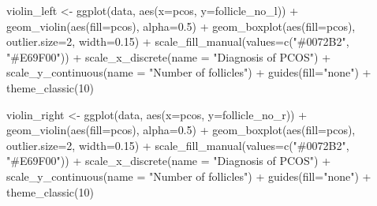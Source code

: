 \documentclass[
]{article}
\newenvironment{Shaded}{\begin{snugshade}}{\end{snugshade}}
\newcommand{\AttributeTok}[1]{\textcolor[rgb]{0.77,0.63,0.00}{#1}}
\newcommand{\DecValTok}[1]{\textcolor[rgb]{0.00,0.00,0.81}{#1}}
\newcommand{\FloatTok}[1]{\textcolor[rgb]{0.00,0.00,0.81}{#1}}
\newcommand{\FunctionTok}[1]{\textcolor[rgb]{0.00,0.00,0.00}{#1}}
\newcommand{\NormalTok}[1]{#1}
\newcommand{\OtherTok}[1]{\textcolor[rgb]{0.56,0.35,0.01}{#1}}
\newcommand{\SpecialCharTok}[1]{\textcolor[rgb]{0.00,0.00,0.00}{#1}}
\newcommand{\StringTok}[1]{\textcolor[rgb]{0.31,0.60,0.02}{#1}}
\begin{document}
\begin{Shaded}
\begin{Highlighting}[]
\NormalTok{violin\_left }\OtherTok{\textless{}{-}} \FunctionTok{ggplot}\NormalTok{(data, }\FunctionTok{aes}\NormalTok{(}\AttributeTok{x=}\NormalTok{pcos, }\AttributeTok{y=}\NormalTok{follicle\_no\_l)) }\SpecialCharTok{+}
  \FunctionTok{geom\_violin}\NormalTok{(}\FunctionTok{aes}\NormalTok{(}\AttributeTok{fill=}\NormalTok{pcos), }\AttributeTok{alpha=}\FloatTok{0.5}\NormalTok{) }\SpecialCharTok{+}
  \FunctionTok{geom\_boxplot}\NormalTok{(}\FunctionTok{aes}\NormalTok{(}\AttributeTok{fill=}\NormalTok{pcos), }\AttributeTok{outlier.size=}\DecValTok{2}\NormalTok{, }\AttributeTok{width=}\FloatTok{0.15}\NormalTok{) }\SpecialCharTok{+}
  \FunctionTok{scale\_fill\_manual}\NormalTok{(}\AttributeTok{values=}\FunctionTok{c}\NormalTok{(}\StringTok{"\#0072B2"}\NormalTok{, }\StringTok{"\#E69F00"}\NormalTok{)) }\SpecialCharTok{+}
  \FunctionTok{scale\_x\_discrete}\NormalTok{(}\AttributeTok{name =} \StringTok{"Diagnosis of PCOS"}\NormalTok{) }\SpecialCharTok{+}
  \FunctionTok{scale\_y\_continuous}\NormalTok{(}\AttributeTok{name =} \StringTok{"Number of follicles"}\NormalTok{) }\SpecialCharTok{+}
  \FunctionTok{guides}\NormalTok{(}\AttributeTok{fill=}\StringTok{"none"}\NormalTok{) }\SpecialCharTok{+}
  \FunctionTok{theme\_classic}\NormalTok{(}\DecValTok{10}\NormalTok{)}

\NormalTok{violin\_right }\OtherTok{\textless{}{-}} \FunctionTok{ggplot}\NormalTok{(data, }\FunctionTok{aes}\NormalTok{(}\AttributeTok{x=}\NormalTok{pcos, }\AttributeTok{y=}\NormalTok{follicle\_no\_r)) }\SpecialCharTok{+}
  \FunctionTok{geom\_violin}\NormalTok{(}\FunctionTok{aes}\NormalTok{(}\AttributeTok{fill=}\NormalTok{pcos), }\AttributeTok{alpha=}\FloatTok{0.5}\NormalTok{) }\SpecialCharTok{+}
  \FunctionTok{geom\_boxplot}\NormalTok{(}\FunctionTok{aes}\NormalTok{(}\AttributeTok{fill=}\NormalTok{pcos), }\AttributeTok{outlier.size=}\DecValTok{2}\NormalTok{, }\AttributeTok{width=}\FloatTok{0.15}\NormalTok{) }\SpecialCharTok{+}
  \FunctionTok{scale\_fill\_manual}\NormalTok{(}\AttributeTok{values=}\FunctionTok{c}\NormalTok{(}\StringTok{"\#0072B2"}\NormalTok{, }\StringTok{"\#E69F00"}\NormalTok{)) }\SpecialCharTok{+}
  \FunctionTok{scale\_x\_discrete}\NormalTok{(}\AttributeTok{name =} \StringTok{"Diagnosis of PCOS"}\NormalTok{) }\SpecialCharTok{+}
  \FunctionTok{scale\_y\_continuous}\NormalTok{(}\AttributeTok{name =} \StringTok{"Number of follicles"}\NormalTok{) }\SpecialCharTok{+}
  \FunctionTok{guides}\NormalTok{(}\AttributeTok{fill=}\StringTok{"none"}\NormalTok{) }\SpecialCharTok{+}
  \FunctionTok{theme\_classic}\NormalTok{(}\DecValTok{10}\NormalTok{)}


\end{Highlighting}
\end{Shaded}
\end{document}
